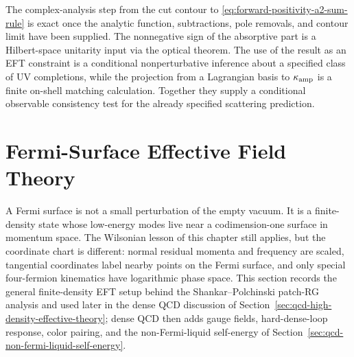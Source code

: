 \begin{remark}
\label{rem:eft-positivity-status-ledger}
The complex-analysis step from the cut contour to
\eqref{eq:forward-positivity-a2-sum-rule} is exact once the analytic function,
subtractions, pole removals, and contour limit have been supplied.  The
nonnegative sign of the absorptive part is a Hilbert-space unitarity input via
the optical theorem.  The use of the result as an EFT constraint is a
conditional nonperturbative inference about a specified class of UV completions,
while the projection from a Lagrangian basis to \(\kappa_{\rm amp}\) is a
finite on-shell matching calculation.  Together they supply a conditional
observable consistency test for the already specified scattering prediction.
\end{remark}

\section{Fermi-Surface Effective Field Theory}
\label{sec:fermi-surface-eft-patch-rg}

A Fermi surface is not a small perturbation of the empty vacuum.  It is a
finite-density state whose low-energy modes live near a codimension-one
surface in momentum space.  The Wilsonian lesson of this chapter still applies,
but the coordinate chart is different: normal residual momenta and frequency
are scaled, tangential coordinates label nearby points on the Fermi surface,
and only special four-fermion kinematics have logarithmic phase space.  This
section records the general finite-density EFT setup behind the
Shankar--Polchinski patch-RG analysis
\cite{Polchinski1992FermiSurface,Shankar1994RGFermiLiquid} and used later in
the dense QCD discussion of
Section~\ref{sec:qcd-high-density-effective-theory}; dense QCD then adds gauge
fields, hard-dense-loop response, color pairing, and the non-Fermi-liquid
self-energy of Section~\ref{sec:qcd-non-fermi-liquid-self-energy}.

